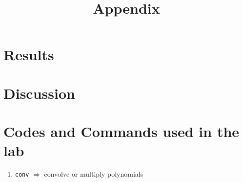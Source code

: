 \documentclass[11pt]{article}
\begin{document}
\section{Results}
\section{Discussion}

\newpage
\appendix
\title{Appendix}\label{doc:apx}
\maketitle

\section{Codes and Commands used in the lab}

\begin{enumerate}
    \item
        \texttt{conv}
        \tabto{1.5in}
        \(\Rightarrow\) convolve or multiply polynomials
\end{enumerate}
\end{document}
